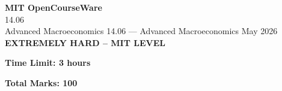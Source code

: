 \documentclass[12pt,a4paper]{exam}
\begin{document}
\begin{center}
{\LARGE \textbf{MIT OpenCourseWare}}\\14.06\\Advanced Macroeconomics
\vspace{0.5cm}
{14.06} --- {Advanced Macroeconomics}
\vspace{0.3cm}
May 2026
\vspace{0.3cm}
\textbf{EXTREMELY HARD -- MIT LEVEL}
\end{center}

\begin{center}
\textbf{Time Limit: 3 hours}
\end{center}

\begin{center}
\textbf{Total Marks: 100}
\end{center}

\vspace{0.5cm}
\end{document}
